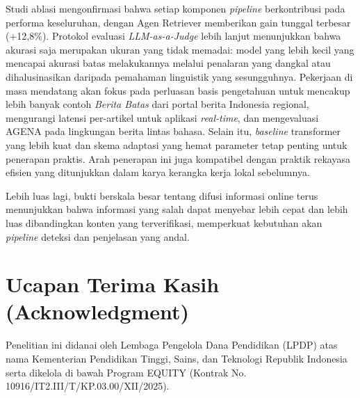 \documentclass{ieeeaccess}
\begin{document}
Studi ablasi mengonfirmasi bahwa setiap komponen \textit{pipeline} berkontribusi pada performa keseluruhan, dengan Agen Retriever memberikan gain tunggal terbesar (+12,8\%). Protokol evaluasi \textit{LLM-as-a-Judge} lebih lanjut menunjukkan bahwa akurasi saja merupakan ukuran yang tidak memadai: model yang lebih kecil yang mencapai akurasi batas melakukannya melalui penalaran yang dangkal atau dihalusinasikan daripada pemahaman linguistik yang sesungguhnya. Pekerjaan di masa mendatang akan fokus pada perluasan basis pengetahuan untuk mencakup lebih banyak contoh \textit{Berita Batas} dari portal berita Indonesia regional, mengurangi latensi per-artikel untuk aplikasi \textit{real-time}, dan mengevaluasi AGENA pada lingkungan berita lintas bahasa. Selain itu, \textit{baseline} transformer yang lebih kuat dan skema adaptasi yang hemat parameter tetap penting untuk penerapan praktis. Arah penerapan ini juga kompatibel dengan praktik rekayasa efisien yang ditunjukkan dalam karya kerangka kerja lokal sebelumnya.

Lebih luas lagi, bukti berskala besar tentang difusi informasi online terus menunjukkan bahwa informasi yang salah dapat menyebar lebih cepat dan lebih luas dibandingkan konten yang terverifikasi, memperkuat kebutuhan akan \textit{pipeline} deteksi dan penjelasan yang andal.

\section*{Ucapan Terima Kasih (Acknowledgment)}
Penelitian ini didanai oleh Lembaga Pengelola Dana Pendidikan (LPDP) atas nama Kementerian Pendidikan Tinggi, Sains, dan Teknologi Republik Indonesia serta dikelola di bawah Program EQUITY (Kontrak No. 10916/IT2.III/T/KP.03.00/XII/2025).
\end{document}
